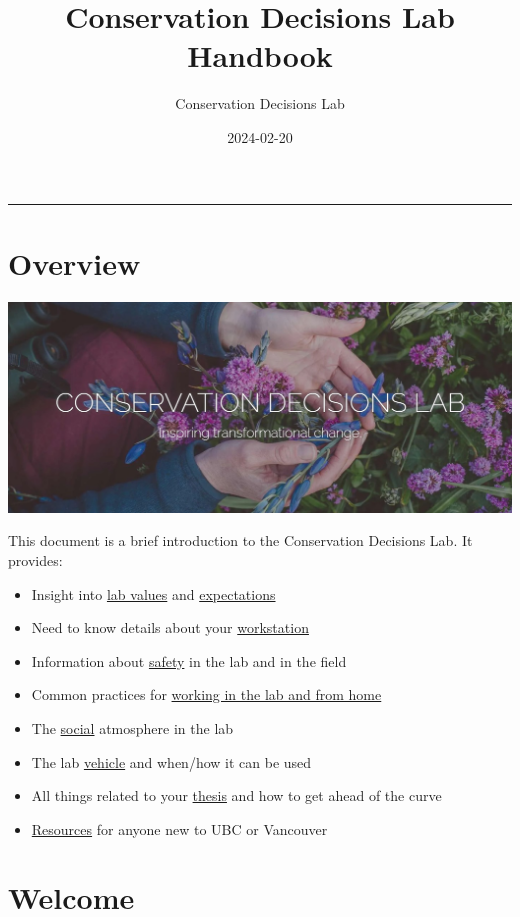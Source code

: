 \documentclass[
]{book}
\title{Conservation Decisions Lab Handbook}
\author{Conservation Decisions Lab}
\date{2024-02-20}
\begin{document}
\maketitle

{
\setcounter{tocdepth}{1}
\tableofcontents
}
\begin{center}\rule{0.5\linewidth}{0.5pt}\end{center}

\hypertarget{overview}{%
\chapter*{Overview}\label{overview}}

\begin{center}\includegraphics[width=0.5\linewidth]{img/cdl-lab-banner} \end{center}

This document is a brief introduction to the Conservation Decisions Lab. It provides:

\begin{itemize}
\item
  Insight into \protect\hyperlink{diversity}{lab values} and \protect\hyperlink{expectations}{expectations}
\item
  Need to know details about your \protect\hyperlink{computers}{workstation}
\item
  Information about \protect\hyperlink{safety}{safety} in the lab and in the field
\item
  Common practices for \protect\hyperlink{working}{working in the lab and from home}
\item
  The \protect\hyperlink{social}{social} atmosphere in the lab
\item
  The lab \protect\hyperlink{vehicle}{vehicle} and when/how it can be used
\item
  All things related to your \protect\hyperlink{thesis}{thesis} and how to get ahead of the curve
\item
  \protect\hyperlink{resources}{Resources} for anyone new to UBC or Vancouver
\end{itemize}

\hypertarget{welcome}{%
\chapter*{Welcome}\label{welcome}}
\end{document}
